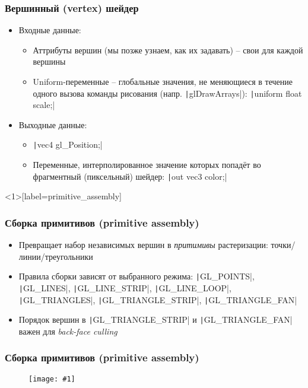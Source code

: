 \documentclass[10pt]{beamer}
\newcommand{\slideimage}[1]{
  \begin{figure}
    \begin{adjustbox}{width=\textwidth, totalheight=\textheight-2\baselineskip-2\baselineskip,keepaspectratio}
      \texttt{[image: \#1]}
    \end{adjustbox}
  \end{figure}
}
\begin{document}
\begin{frame}[fragile]
\frametitle{Вершинный (vertex) шейдер}
\begin{itemize}
\pause
\item Входные данные:
\pause
\begin{itemize}
\item Аттрибуты вершин (мы позже узнаем, как их задавать) -- свои для каждой вершины
\pause
\item Uniform-переменные -- глобальные значения, не меняющиеся в течение одного вызова команды рисования (напр. \texttt|glDrawArrays|):
\texttt|uniform float scale;|
\end{itemize}
\pause
\item Выходные данные:
\begin{itemize}
\item \texttt|vec4 gl_Position;|
\pause
\item Переменные, интерполированное значение которых попадёт во фрагментный (пиксельный) шейдер: \texttt|out vec3 color;|
\end{itemize}
\end{itemize}
\end{frame}

\begin{frame}<1>[label=primitive_assembly]
\frametitle{Сборка примитивов (primitive assembly)}
\begin{itemize}
\item Превращает набор независимых вершин в \textit{притимивы} растеризации: точки/линии/треугольники
\item Правила сборки зависят от выбранного режима: \texttt|GL_POINTS|, \texttt|GL_LINES|, \texttt|GL_LINE_STRIP|, \texttt|GL_LINE_LOOP|, \texttt|GL_TRIANGLES|, \texttt|GL_TRIANGLE_STRIP|, \texttt|GL_TRIANGLE_FAN|
\pause
\item Порядок вершин в \texttt|GL_TRIANGLE_STRIP| и \texttt|GL_TRIANGLE_FAN| важен для \textit{back-face culling}
\end{itemize}
\end{frame}

\begin{frame}
\frametitle{Сборка примитивов (primitive assembly)}
\slideimage{primitives.png}
\end{frame}

\end{document}
